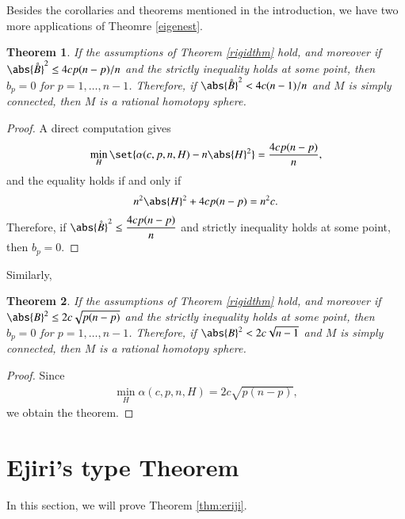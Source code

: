 \documentclass[12pt]{amsart}
\theoremstyle{plain}
\newtheorem{theorem}{Theorem}[section]
\theoremstyle{remark}
\theoremstyle{definition}
\numberwithin{equation}{section}
\begin{document}
Besides the corollaries and theorems mentioned in the introduction, we have two more applications of Theomre \ref{eigenest}.
\begin{theorem}If the assumptions of Theorem \ref{rigidthm} hold, and moreover if $\abs{\mathring{B}}^2\leq4cp(n-p)/n$ and the strictly inequality holds at some point, then $b_p=0$ for $p=1,\dotsc, n-1$. Therefore, if $\abs{\mathring{B}}^2<4c(n-1)/n$ and $M$ is simply connected, then $M$ is a rational homotopy sphere.
\end{theorem}
\begin{proof}
A direct computation gives
\begin{align*}
\min_{H}\set{\alpha(c,p,n,H)-n\abs{H}^2}=\dfrac{4cp(n-p)}{n},
\end{align*}
and the equality holds if and only if
\begin{align*}
n^2\abs{H}^2+4cp(n-p)=n^2c.
\end{align*}
Therefore, if $\abs{\mathring{B}}^2\leq\dfrac{4cp(n-p)}{n}$ and strictly inequality holds at some point, then $b_p=0$.
\end{proof}
Similarly,
\begin{theorem}If the assumptions of Theorem \ref{rigidthm} hold, and moreover if
$\abs{B}^2\leq 2c\sqrt{p(n-p)}$ and the strictly inequality holds at some point, then $b_p=0$ for $p=1,\dotsc, n-1$. Therefore, if $\abs{B}^2<2c\sqrt{n-1}$ and $M$ is simply connected, then $M$ is a rational homotopy sphere.
\end{theorem}
\begin{proof}
Since
\begin{align*}
\min_{H}\alpha(c,p,n,H)=2c\sqrt{p(n-p)},
\end{align*}
we obtain the theorem.
\end{proof}

\section{Ejiri's type Theorem}
In this section, we will prove Theorem \ref{thm:eriji}.
\end{document}
